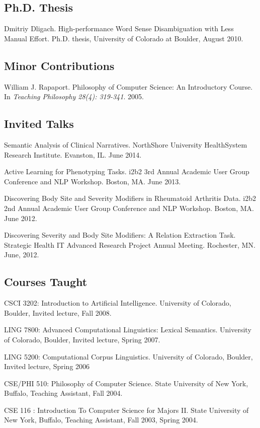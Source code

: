 \documentclass[letterpaper]{article}
\renewenvironment{itemize}{
  \begin{list}{}{
    \setlength{\leftmargin}{1.5em}
  }
}{
  \end{list}
}
\begin{document}
\subsection*{Ph.D. Thesis}
\begin{itemize}
\item Dmitriy Dligach. High-performance Word Sense Disambiguation with Less Manual Effort. Ph.D. thesis, University of Colorado at Boulder, August 2010.
\end{itemize}

\subsection*{Minor Contributions}
\begin{itemize}
\item William J. Rapaport. Philosophy of Computer Science: An Introductory Course. In \emph {Teaching Philosophy 28(4): 319-341}. 2005.
\end{itemize}

\subsection*{Invited Talks}
\begin{itemize}
\item Semantic Analysis of Clinical Narratives. NorthShore University HealthSystem Research Institute. Evanston, IL. June 2014.
\item Active Learning for Phenotyping Tasks. i2b2 3rd Annual Academic User Group Conference and NLP Workshop. Boston, MA. June 2013.
\item Discovering Body Site and Severity Modifiers in Rheumatoid Arthritis Data. i2b2 2nd Annual Academic User Group Conference and NLP Workshop. Boston, MA. June 2012.
\item Discovering Severity and Body Site Modifiers: A Relation Extraction Task. Strategic Health IT Advanced Research Project Annual Meeting. Rochester, MN. June, 2012.
\end{itemize}

\subsection*{Courses Taught}

\begin{itemize}
\item CSCI 3202: Introduction to Artificial Intelligence. University of Colorado, Boulder, Invited lecture, Fall 2008.
\item LING 7800: Advanced Computational Linguistics: Lexical Semantics. University of Colorado, Boulder, Invited lecture, Spring 2007.
\item LING 5200: Computational Corpus Linguistics. University of Colorado, Boulder, Invited lecture, Spring 2006
\item CSE/PHI 510: Philosophy of Computer Science. State University of New York, Buffalo, Teaching Assistant, Fall 2004.
\item CSE 116 : Introduction To Computer Science for Majors II. State University of New York, Buffalo, Teaching Assistant, Fall 2003, Spring 2004. 
\end{itemize}
\end{document}
